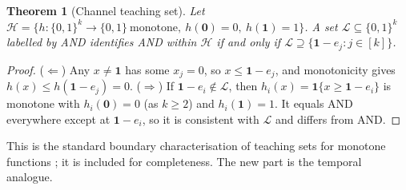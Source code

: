 \documentclass[11pt]{article}
\newtheorem{theorem}{Theorem}[section]
\theoremstyle{definition}
\theoremstyle{remark}
\newcommand{\1}{\mathbf{1}}
\begin{document}
\begin{theorem}[Channel teaching set]\label{thm:teach}
Let $\mathcal H=\{h:\{0,1\}^k\to\{0,1\}\ \text{monotone},\ h(\bm0)=0,\ h(\1)=1\}$. A set $\mathcal L\subseteq\{0,1\}^k$ labelled by AND identifies AND within $\mathcal H$ if and only if $\mathcal L\supseteq\{\1-e_j:j\in[k]\}$.
\end{theorem}
\begin{proof}
($\Leftarrow$) Any $x\ne\1$ has some $x_j=0$, so $x\le\1-e_j$, and monotonicity gives $h(x)\le h(\1-e_j)=0$.
($\Rightarrow$) If $\1-e_i\notin\mathcal L$, then $h_i(x)=\1\{x\ge\1-e_i\}$ is monotone with $h_i(\bm0)=0$ (as $k\ge2$) and $h_i(\1)=1$. It equals AND everywhere except at $\1-e_i$, so it is consistent with $\mathcal L$ and differs from AND.
\end{proof}
This is the standard boundary characterisation of teaching sets for monotone functions \citep{goldman1995}; it is included for completeness. The new part is the temporal analogue.
\end{document}

